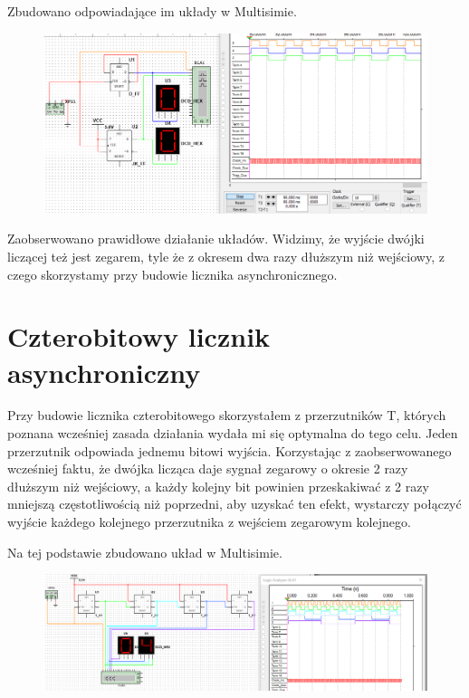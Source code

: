 \documentclass[12pt,a4paper]{article}
\begin{document}
\newpage
Zbudowano odpowiadające im układy w Multisimie.
\begin{figure}[H]
\centering
\includegraphics[width=\textwidth]{img/4a_circuit}
\end{figure}

Zaobserwowano prawidłowe działanie układów. Widzimy, że wyjście dwójki liczącej też jest zegarem, tyle że z okresem dwa razy dłuższym niż wejściowy, z czego skorzystamy przy budowie licznika asynchronicznego.


\section{Czterobitowy licznik asynchroniczny}
Przy budowie licznika czterobitowego skorzystałem z przerzutników T, których poznana wcześniej zasada działania wydała mi się optymalna do tego celu. Jeden przerzutnik odpowiada jednemu bitowi wyjścia. Korzystając z zaobserwowanego wcześniej faktu, że dwójka licząca daje sygnał zegarowy o okresie 2 razy dłuższym niż wejściowy, a każdy kolejny bit powinien przeskakiwać z 2 razy mniejszą częstotliwością niż poprzedni, aby uzyskać ten efekt, wystarczy połączyć wyjście każdego kolejnego przerzutnika z wejściem zegarowym kolejnego.

Na tej podstawie zbudowano układ w Multisimie.
\begin{figure}[H]
\centering
\includegraphics[width=\textwidth]{img/4b_circuit}
\end{figure}
\end{document}
